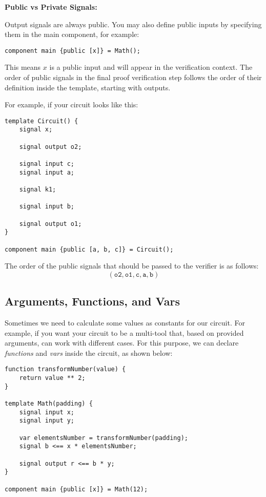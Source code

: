 \documentclass[../lecture-notes-148x210.tex]{subfiles}
\begin{document}
\vspace{0.5cm}

\textbf{Public vs Private Signals:}

Output signals are always public.
You may also define public inputs by specifying them in the main component, for example:

\begin{lstlisting}[language=Circom,numbers=none]
component main {public [x]} = Math();
\end{lstlisting}

This means $x$ is a public input and will appear in the verification context.
The order of public signals in the final proof verification step follows the order of their definition inside the template, starting with outputs.

For example, if your circuit looks like this:
\begin{lstlisting}[language=Circom]
template Circuit() {
    signal x;

    signal output o2;

    signal input c;
    signal input a;

    signal k1;

    signal input b;

    signal output o1;
}

component main {public [a, b, c]} = Circuit();
\end{lstlisting}

The order of the public signals that should be passed to the verifier is as follows:
\[ (\texttt{o2}, \texttt{o1}, \texttt{c}, \texttt{a}, \texttt{b}) \]

\subsection{Arguments, Functions, and Vars}

Sometimes we need to calculate some values as constants for our circuit.
For example, if you want your circuit to be a multi-tool that, based on provided arguments, can work with different cases.
For this purpose, we can declare \textit{functions} and \textit{vars} inside the circuit, as shown below:

\begin{lstlisting}[language=Circom]
function transformNumber(value) {
    return value ** 2;
}

template Math(padding) {
    signal input x;
    signal input y;

    var elementsNumber = transformNumber(padding);
    signal b <== x * elementsNumber;

    signal output r <== b * y;
}

component main {public [x]} = Math(12);
\end{lstlisting}
\end{document}
